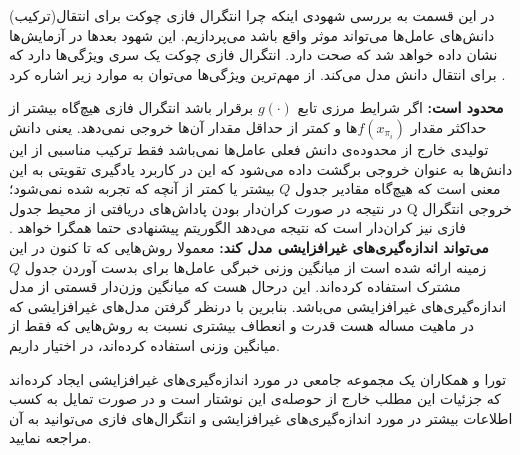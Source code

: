 در این قسمت به بررسی شهودی اینکه چرا انتگرال فازی چوکت برای انتقال(ترکیب) دانش‌های عامل‌ها می‌تواند موثر واقع باشد می‌پردازیم. این شهود بعدها در آزمایش‌ها نشان داده خواهد شد که صحت دارد. انتگرال فازی چوکت یک سری ویژگی‌ها دارد که برای انتقال دانش مدل می‌کند. از مهم‌ترین ویژگی‌ها می‌توان به موارد زیر اشاره کرد .
\begin{enumerate}
 \textbf{محدود است:} اگر شرایط مرزی تابع $g(\cdot)$ برقرار باشد انتگرال‌ فازی هیچ‌گاه بیشتر از حداکثر مقدار $f(x_{\pi_i})$ها و کمتر از حداقل مقدار آن‌ها خروجی نمی‌دهد. یعنی دانش تولیدی خارج از محدوده‌ی دانش فعلی عامل‌ها نمی‌باشد فقط ترکیب مناسبی از این دانش‌ها به عنوان خروجی برگشت داده می‌شود که این در کاربرد یادگیری تقویتی به این معنی است که هیچ‌گاه مقادیر جدول $Q$ بیشتر یا کمتر از آنچه که تجربه شده نمی‌شود؛ در نتیجه در صورت کران‌دار بودن پاداش‌های دریافتی از محیط جدول Q خروجی انتگرال فازی نیز کران‌دار است که نتیجه می‌دهد الگوریتم پیشنهادی حتما همگرا خواهد .
 \textbf{می‌تواند اندازه‌گیری‌های غیرافزایشی مدل کند:} معمولا روش‌هایی که تا ‌کنون در این زمینه ارائه شده است از میانگین وزنی خبرگی عامل‌ها برای بدست آوردن جدول $Q$ مشترک استفاده کرده‌اند. این درحال هست که میانگین وزن‌دار قسمتی از مدل اندازه‌گیری‌های غیرافزایشی می‌باشد. بنابرین با درنظر گرفتن مدل‌های غیرافزایشی که در ماهیت مساله هست قدرت و انعطاف بیشتری نسبت به روش‌هایی که فقط از میانگین وزنی استفاده کرده‌اند، در اختیار داریم.
\end{enumerate}

تورا و همکاران یک مجموعه جامعی در مورد اندازه‌گیری‌های غیرافزایشی ایجاد کرده‌اند که جزئیات این مطلب خارج از حوصله‌ی این نوشتار است و در صورت تمایل به کسب اطلاعات بیشتر در مورد اندازه‌گیری‌های غیرافزایشی و انتگرال‌های فازی می‌توانید به آن مراجعه نمایید.

